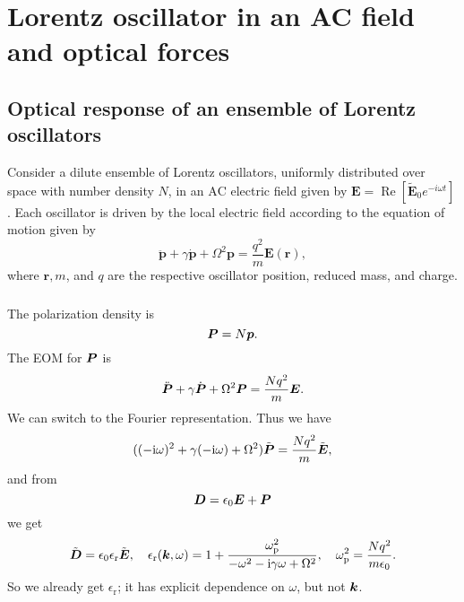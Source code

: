 \documentclass[hyperref, a4paper]{article}
\newcommand*{\ii}{\mathrm{i}}
\newcommand*{\omegap}{\omega_{\text{p}}}
\newcommand{\epsr}{\epsilon_{\text{r}}}
\newcommand{\Efreq}{\tilde{\vb*{E}}}
\newcommand{\Dfreq}{\tilde{\vb*{D}}}
\begin{document}
\section{Lorentz oscillator in an AC field and optical forces}

\subsection{Optical response of an ensemble of Lorentz oscillators}

Consider a dilute ensemble of Lorentz oscillators, uniformly distributed over space with number density $N$, in an $\mathrm{AC}$ electric field given by $\mathbf{E}=\operatorname{Re}\left[\tilde{\mathbf{E}}_0 e^{-i \omega t}\right]$. Each oscillator is driven by the local electric field according to the equation of motion given by
$$
\ddot{\mathbf{p}}+\gamma \dot{\mathbf{p}}+\Omega^2 \mathbf{p}=\frac{q^2}{m} \mathbf{E}(\mathbf{r}),
$$
where $\mathbf{r}, m$, and $q$ are the respective oscillator position, reduced mass, and charge.

\subsubsection{}

The polarization density is 
\begin{equation}
    \vb*{P} = N \vb*{p}.
\end{equation}
The EOM for $\vb*{P}$ is 
\begin{equation}
    \ddot{\vb*{P}} + \gamma \dot{\vb*{P}} + \Omega^2 \vb*{P} = \frac{N q^2}{m} \vb*{E}.
\end{equation}
We can switch to the Fourier representation.
Thus we have 
\begin{equation}
    ((-\ii \omega)^2 + \gamma (- \ii \omega) + \Omega^2) \tilde{\vb*{P}} = \frac{N q^2}{m} \Efreq,
\end{equation}
and from 
\begin{equation}
    \vb*{D} = \epsilon_0 \vb*{E} + \vb*{P}
\end{equation}
we get 
\begin{equation}
    \Dfreq = \epsilon_0 \epsr \Efreq, \quad 
    \epsr(\vb*{k}, \omega) = 1 + \frac{\omegap^2}{- \omega^2 - \ii \gamma \omega + \Omega^2}, \quad 
    \omegap^2 = \frac{N q^2}{m \epsilon_0}.
\end{equation}
So we already get $\epsr$; it has explicit dependence on $\omega$,
but not $\vb*{k}$.

\subsubsection{}
\end{document}
